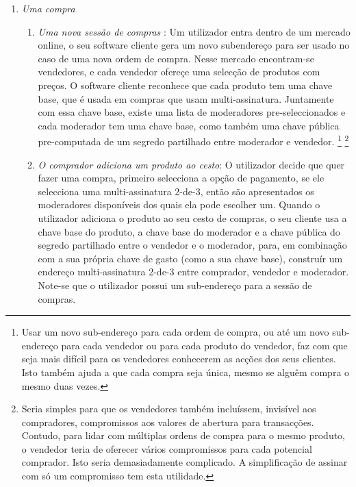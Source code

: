 \begin{enumerate}
    \item {\em Uma compra}
    \begin{enumerate}
        \item {\em Uma nova sessão de compras} : Um utilizador entra dentro de um mercado online, o seu software cliente gera um novo subendereço para ser usado no caso de uma nova ordem de compra. Nesse mercado encontram-se vendedores, e cada vendedor ofereçe uma selecção de produtos com preços. O software cliente reconhece que cada produto tem uma chave base, que é usada em compras que usam multi-assinatura. Juntamente com essa chave base, existe uma lista de moderadores pre-seleccionados e cada moderador tem uma chave base, como também uma chave pública pre-computada de um segredo partilhado entre moderador e vendedor.
\footnote{Usar um novo sub-endereço para cada ordem de compra, ou até um novo sub-endereço para cada vendedor ou para cada produto do vendedor, faz com que seja mais difícil para os vendedores conhecerem as acções dos seus clientes. Isto também ajuda a que cada compra seja única, mesmo se alguêm compra o mesmo duas vezes.}
\footnote{Seria simples para que os vendedores também incluíssem, invisível aos compradores, compromissos aos valores de abertura para transacções. Contudo, para lidar com múltiplas ordens de compra para o mesmo produto, o vendedor teria de oferecer vários compromissos para cada potencial comprador. Isto seria demasiadamente complicado. A simplificação de assinar com só um compromisso tem esta utilidade.}
        \item {\em O comprador adiciona um produto ao cesto}: O utilizador decide que quer fazer uma compra, primeiro selecciona a opção de pagamento, se ele selecciona uma multi-assinatura 2-de-3, então são apresentados os moderadores disponíveis dos quais ela pode escolher um. Quando o utilizador adiciona o produto ao seu cesto de compras, o seu cliente usa a chave base do produto, a chave base do moderador e a chave pública do segredo partilhado entre o vendedor e o moderador, para, em combinação com a sua própria chave de gasto (como a sua chave base), construír um endereço multi-assinatura 2-de-3 entre comprador, vendedor e moderador. Note-se que o utilizador possui um sub-endereço para a sessão de compras.

\end{enumerate}
\end{enumerate}
